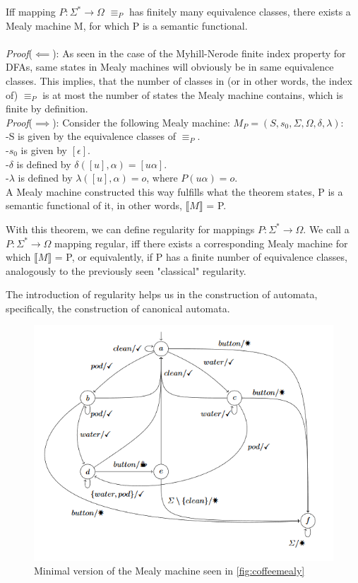 \begin{theorem}
	Iff mapping $P: \Sigma^*\to\Omega$ $\equiv_P$ has finitely many equivalence classes, there exists a Mealy machine M, for which P is a semantic functional.
	\\\\
	\textit{Proof}($\impliedby$): As seen in the case of the Myhill-Nerode finite index property for DFAs, same states in Mealy machines will obviously be in same equivalence classes. This implies, that the number of classes in (or in other words, the index of) $\equiv_P$ is at most the number of states the Mealy machine contains, which is finite by definition.
	\\
	\textit{Proof}($\implies$): Consider the following Mealy machine: $M_P=(S,s_{0},\Sigma,\Omega,\delta,\lambda)$:\\
	\null\qquad -S is given by the equivalence classes of $\equiv_P$.\\
	\null\qquad -$s_0$ is given by $[\epsilon]$.\\
	\null\qquad -$\delta$ is defined by $\delta([u], \alpha) = [u\alpha]$.\\
	\null\qquad -$\lambda$ is defined by $\lambda([u], \alpha) = o$, where $P(u\alpha) = o$.\\
	A Mealy machine constructed this way fulfills what the theorem states, P is a semantic functional of it, in other words, $\llbracket M\rrbracket$ = P.
\end{theorem}

With this theorem, we can define regularity for mappings $P:\Sigma^*\to\Omega$. We call a $P:\Sigma^*\to\Omega$ mapping regular, iff there exists a corresponding Mealy machine for which $\llbracket M\rrbracket$ = P, or equivalently, if P has a finite number of equivalence classes, analogously to the previously seen "classical" regularity.

The introduction of regularity helps us in the construction of automata, specifically, the construction of canonical automata. 


\begin{figure}[H]
	\centering
	\includegraphics[width=0.7\linewidth]{include/coffeemealyminimal}
	\caption{Minimal version of the Mealy machine seen in \ref{fig:coffeemealy}}
	\label{fig:coffeemealyminimal}
\end{figure}


